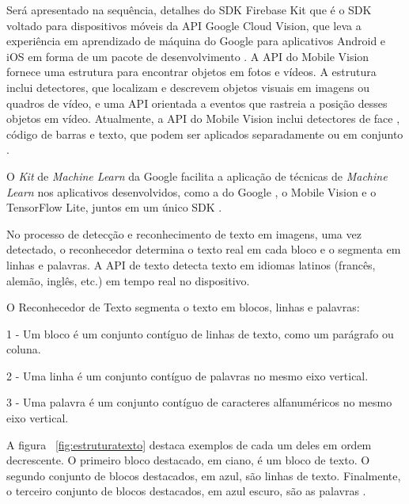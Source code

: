 Será apresentado na sequência, detalhes do  SDK Firebase  Kit que é o SDK voltado para dispositivos móveis da API Google Cloud Vision, que leva a experiência em aprendizado de máquina do Google para aplicativos Android e iOS em forma de um pacote de desenvolvimento \cite{CODELABS}. A API do Mobile Vision fornece uma estrutura para encontrar objetos em fotos e vídeos. A estrutura inclui detectores, que localizam e descrevem objetos visuais em imagens ou quadros de vídeo, e uma API orientada a eventos que rastreia a posição desses objetos em vídeo. Atualmente, a API do Mobile Vision inclui detectores de face , código de barras e texto, que podem ser aplicados separadamente ou em conjunto \cite{INTROMOBILEVISION}.


O \textit{Kit} de \textit{Machine Learn} da Google facilita a aplicação de técnicas de \textit{Machine Learn} nos aplicativos desenvolvidos, como a  do Google , o Mobile Vision e o TensorFlow Lite, juntos em um único SDK \cite{CODELABS}.

No processo de detecção e reconhecimento de texto em imagens, uma vez detectado, o reconhecedor determina o texto real em cada bloco e o segmenta em linhas e palavras. A API de texto detecta texto em idiomas latinos (francês, alemão, inglês, etc.) em tempo real no dispositivo.

O Reconhecedor de Texto segmenta o texto em blocos, linhas e palavras:

1 - Um bloco é um conjunto contíguo de linhas de texto, como um parágrafo ou coluna.

2 - Uma linha é um conjunto contíguo de palavras no mesmo eixo vertical.

3 - Uma palavra é um conjunto contíguo de caracteres alfanuméricos no mesmo eixo vertical.

A figura ~\ref{fig:estruturatexto} destaca exemplos de cada um deles em ordem decrescente. O primeiro bloco destacado, em ciano, é um bloco de texto. O segundo conjunto de blocos destacados, em azul, são linhas de texto. Finalmente, o terceiro conjunto de blocos destacados, em azul escuro, são as palavras \cite{MOBILEVISION}.

